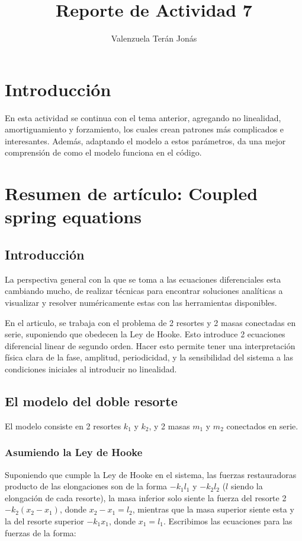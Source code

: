 \documentclass[a4paper]{article}
\title{Reporte de Actividad 7}
\author{Valenzuela Terán Jonás}
\begin{document}
\maketitle

\section{Introducción}

En esta actividad se continua con el tema anterior, agregando no linealidad, amortiguamiento y forzamiento, los cuales crean patrones más complicados e interesantes. Además, adaptando el modelo a estos parámetros, da una mejor comprensión de como el modelo funciona en el código.


\section{Resumen de artículo: Coupled spring equations}

\subsection{Introducción}

La perspectiva general con la que se toma a las ecuaciones diferenciales esta cambiando mucho, de realizar técnicas para encontrar soluciones analíticas a visualizar y resolver numéricamente estas con las herramientas disponibles.

En el articulo, se trabaja con el problema de 2 resortes y 2 masas conectadas en serie, suponiendo que obedecen la Ley de Hooke. Esto introduce 2 ecuaciones diferencial linear de segundo orden. Hacer esto permite tener una interpretación física clara de la fase, amplitud, periodicidad, y la sensibilidad del sistema a las condiciones iniciales al introducir no linealidad.

\subsection{El modelo del doble resorte}

El modelo consiste en 2 resortes $k_1$ y $k_2$, y 2 masas $m_1$ y $m_2$ conectados en serie.

\subsubsection{Asumiendo la Ley de Hooke}

Suponiendo que  cumple la Ley de Hooke en el sistema, las fuerzas restauradoras producto de las elongaciones son de la forma $-k_1 l_1$ y $-k_2 l_2$ ($l$ siendo la elongación de cada resorte), la masa inferior solo siente la fuerza del resorte 2 $-k_2 (x_2 - x_1)$, donde $x_2 - x_1 = l_2$, mientras que la masa superior siente esta y la del resorte superior $-k_1 x_1$, donde $x_1 = l_1$. Escribimos las ecuaciones para las fuerzas de la forma:
\end{document}
